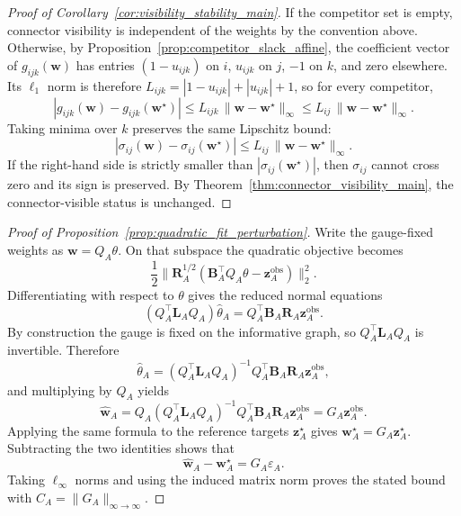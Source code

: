 \documentclass[preprint,12pt]{elsarticle}
\newcommand{\weights}{\mathbf{w}}
\newcommand{\inc}{\mathbf{B}}
\newcommand{\lap}{\mathbf{L}}
\begin{document}
\begin{proof}[Proof of Corollary~\ref{cor:visibility_stability_main}]
If the competitor set is empty, connector visibility is independent of the
weights by the convention above. Otherwise, by
Proposition~\ref{prop:competitor_slack_affine}, the coefficient vector of
$g_{ijk}(\weights)$ has entries $(1-u_{ijk})$ on $i$, $u_{ijk}$ on $j$, $-1$ on
$k$, and zero elsewhere. Its $\ell_1$ norm is therefore
$L_{ijk}=|1-u_{ijk}|+|u_{ijk}|+1$, so for every competitor,
\begin{equation}
    |g_{ijk}(\weights)-g_{ijk}(\weights^\star)|
    \le L_{ijk}\,\|\weights-\weights^\star\|_\infty
    \le L_{ij}\,\|\weights-\weights^\star\|_\infty.
\end{equation}
Taking minima over $k$ preserves the same Lipschitz bound:
\begin{equation}
    |\sigma_{ij}(\weights)-\sigma_{ij}(\weights^\star)|
    \le L_{ij}\,\|\weights-\weights^\star\|_\infty.
\end{equation}
If the right-hand side is strictly smaller than
$|\sigma_{ij}(\weights^\star)|$, then $\sigma_{ij}$ cannot cross zero and its
sign is preserved. By Theorem~\ref{thm:connector_visibility_main}, the
connector-visible status is unchanged.
\end{proof}

\begin{proof}[Proof of Proposition~\ref{prop:quadratic_fit_perturbation}]
Write the gauge-fixed weights as $\weights=Q_A\theta$. On that subspace the
quadratic objective becomes
\begin{equation}
    \frac12\bigl\|\mathbf{R}_A^{1/2}(\inc_A^\top Q_A\theta - \mathbf{z}^{\mathrm{obs}}_A)\bigr\|_2^2.
\end{equation}
Differentiating with respect to $\theta$ gives the reduced normal equations
\begin{equation}
    (Q_A^\top \lap_A Q_A)\widehat{\theta}_A
    =Q_A^\top \inc_A\mathbf{R}_A\mathbf{z}^{\mathrm{obs}}_A.
\end{equation}
By construction the gauge is fixed on the informative graph, so
$Q_A^\top \lap_A Q_A$ is invertible. Therefore
\begin{equation}
    \widehat{\theta}_A
    =(Q_A^\top \lap_A Q_A)^{-1}Q_A^\top \inc_A\mathbf{R}_A\mathbf{z}^{\mathrm{obs}}_A,
\end{equation}
and multiplying by $Q_A$ yields
\begin{equation}
    \widehat{\weights}_A
    =Q_A(Q_A^\top \lap_A Q_A)^{-1}Q_A^\top \inc_A\mathbf{R}_A\mathbf{z}^{\mathrm{obs}}_A
    =G_A\mathbf{z}^{\mathrm{obs}}_A.
\end{equation}
Applying the same formula to the reference targets $\mathbf{z}^{\star}_A$ gives
$\weights_A^\star=G_A\mathbf{z}^{\star}_A$. Subtracting the two identities shows
that
\begin{equation}
    \widehat{\weights}_A-\weights_A^\star = G_A\varepsilon_A.
\end{equation}
Taking $\ell_\infty$ norms and using the induced matrix norm proves the stated
bound with $C_A=\|G_A\|_{\infty\to\infty}$.
\end{proof}
\end{document}
